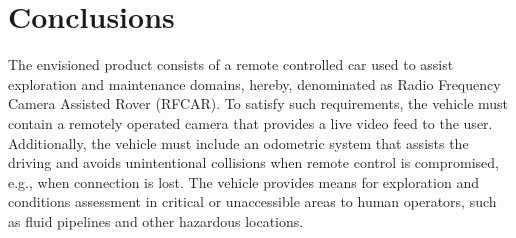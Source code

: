 \chapter{Conclusions}%
\label{ch:conclusions}
The envisioned product consists of a remote controlled car used to assist
exploration and maintenance domains, hereby, denominated as Radio Frequency
Camera Assisted Rover (RFCAR). To satisfy such requirements, the vehicle must
contain a remotely operated camera that provides a live video feed to the user.
Additionally, the vehicle must include an odometric system that assists the
driving and avoids unintentional collisions when remote control is compromised, e.g., when connection is lost.
The vehicle provides means for exploration and conditions assessment in critical
or unaccessible areas to human operators, such as fluid pipelines and other
hazardous locations.
%
